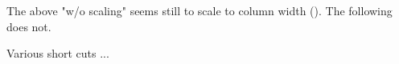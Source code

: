 \newcommand{\postscript}[2]
 {\setlength{\epsfxsize}{#2\hsize}
  \centerline{\epsfbox{#1}}
 }

\newcommand{\post}[1]{
\setlength{\epsfxsize}{\hsize}
  \centerline{\epsfbox{#1}}
 }

The above "w/o scaling" seems still to scale to column width (\hsize).
The following does not.

\newcommand{\post}[1]{ \centerline{\epsfbox{#1}} }

Various short cuts ...

\newcommand{\be}{\begin{equation}}
\newcommand{\ee}{\end{equation}}
\newcommand{\bra}[1]{\left< #1 \right|}
\newcommand{\ket}[1]{\left| #1 \right>}
\newcommand{\braket}[2]{\left< #1 \mid #2 \right>}

